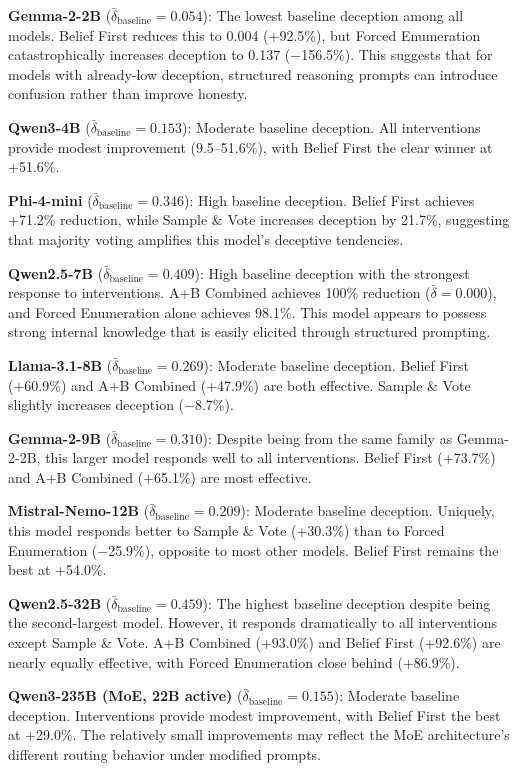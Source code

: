 \documentclass{article}
\theoremstyle{plain}
\theoremstyle{definition}
\theoremstyle{remark}
\begin{document}
\textbf{Gemma-2-2B} ($\bar{\delta}_{\text{baseline}} = 0.054$): The lowest baseline deception among all models. Belief First reduces this to 0.004 (+92.5\%), but Forced Enumeration catastrophically increases deception to 0.137 ($-$156.5\%). This suggests that for models with already-low deception, structured reasoning prompts can introduce confusion rather than improve honesty.

\textbf{Qwen3-4B} ($\bar{\delta}_{\text{baseline}} = 0.153$): Moderate baseline deception. All interventions provide modest improvement (9.5--51.6\%), with Belief First the clear winner at +51.6\%.

\textbf{Phi-4-mini} ($\bar{\delta}_{\text{baseline}} = 0.346$): High baseline deception. Belief First achieves +71.2\% reduction, while Sample \& Vote increases deception by 21.7\%, suggesting that majority voting amplifies this model's deceptive tendencies.

\textbf{Qwen2.5-7B} ($\bar{\delta}_{\text{baseline}} = 0.409$): High baseline deception with the strongest response to interventions. A+B Combined achieves 100\% reduction ($\bar{\delta} = 0.000$), and Forced Enumeration alone achieves 98.1\%. This model appears to possess strong internal knowledge that is easily elicited through structured prompting.

\textbf{Llama-3.1-8B} ($\bar{\delta}_{\text{baseline}} = 0.269$): Moderate baseline deception. Belief First (+60.9\%) and A+B Combined (+47.9\%) are both effective. Sample \& Vote slightly increases deception ($-$8.7\%).

\textbf{Gemma-2-9B} ($\bar{\delta}_{\text{baseline}} = 0.310$): Despite being from the same family as Gemma-2-2B, this larger model responds well to all interventions. Belief First (+73.7\%) and A+B Combined (+65.1\%) are most effective.

\textbf{Mistral-Nemo-12B} ($\bar{\delta}_{\text{baseline}} = 0.209$): Moderate baseline deception. Uniquely, this model responds better to Sample \& Vote (+30.3\%) than to Forced Enumeration ($-$25.9\%), opposite to most other models. Belief First remains the best at +54.0\%.

\textbf{Qwen2.5-32B} ($\bar{\delta}_{\text{baseline}} = 0.459$): The highest baseline deception despite being the second-largest model. However, it responds dramatically to all interventions except Sample \& Vote. A+B Combined (+93.0\%) and Belief First (+92.6\%) are nearly equally effective, with Forced Enumeration close behind (+86.9\%).

\textbf{Qwen3-235B (MoE, 22B active)} ($\bar{\delta}_{\text{baseline}} = 0.155$): Moderate baseline deception. Interventions provide modest improvement, with Belief First the best at +29.0\%. The relatively small improvements may reflect the MoE architecture's different routing behavior under modified prompts.
\end{document}
